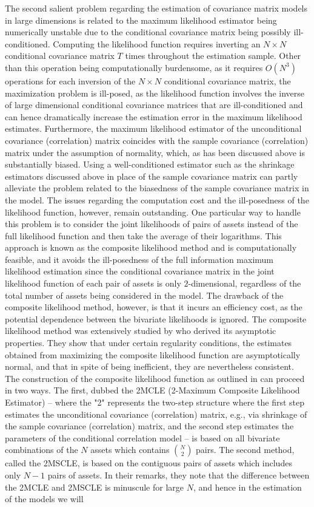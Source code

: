 The second salient problem regarding the estimation of covariance matrix models in large dimensions is related to the maximum likelihood estimator being numerically unstable due to the conditional covariance matrix being possibly ill-conditioned. Computing the likelihood function requires inverting an $N \times N$ conditional covariance matrix $T$ times throughout the estimation sample. Other than this operation being computationally burdensome, as it requires $O(N^3)$ operations for each inversion of the $N \times N$ conditional covariance matrix, the maximization problem is ill-posed, as the likelihood function involves the inverse of large dimensional conditional covariance matrices that are ill-conditioned and can hence dramatically increase the estimation error in the maximum likelihood estimates. Furthermore, the maximum likelihood estimator of the unconditional covariance (correlation) matrix coincides with the sample covariance (correlation) matrix under the assumption of normality, which, as has been discussed above is substantially biased. Using a well-conditioned estimator such as the shrinkage estimators discussed above in place of the sample covariance matrix can partly alleviate the problem related to the biasedness of the sample covariance matrix in the model. The issues regarding the computation cost and the ill-posedness of the likelihood function, however, remain outstanding. One particular way to handle this problem is to consider the joint likelihoods of pairs of assets instead of the full likelihood function and then take the average of their logarithms. This approach is known as the composite likelihood method and is computationally feasible, and it avoids the ill-posedness of the full information maximum likelihood estimation since the conditional covariance matrix in the joint likelihood function of each pair of assets is only $2$-dimensional, regardless of the total number of assets being considered in the model. The drawback of the composite likelihood method, however, is that it incurs an efficiency cost, as the potential dependence between the bivariate likelihoods is ignored. The composite likelihood method was extensively studied by \textcite{PAKELETAL} who derived its asymptotic properties. They show that under certain regularity conditions, the estimates obtained from maximizing the composite likelihood function are asymptotically normal, and that in spite of being inefficient, they are nevertheless consistent. The construction of the composite likelihood function as outlined in \textcite{PAKELETAL} can proceed in two ways. The first, dubbed the 2MCLE (2-Maximum Composite Likelihood Estimator) -- where the  "2" represents the two-step structure where the first step estimates the unconditional covariance (correlation) matrix, e.g., via shrinkage of the sample covariance (correlation) matrix, and the second step estimates the parameters of the conditional correlation model -- is based on all bivariate combinations of the $N$ assets which contains $\binom{N}{2}$ pairs. The second method, called the 2MSCLE, is based on the contiguous pairs of assets which includes only $N-1$ pairs of assets. In their remarks, they note that the difference between the 2MCLE and 2MSCLE is minuscule for large $N$, and hence in the estimation of the models we will 